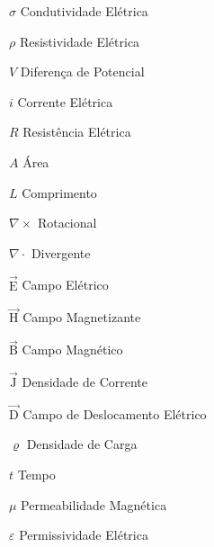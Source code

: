 \documentclass[12pt,twoside,oneright,a4paper,chapter=TITLE,english,brazil]{unipampa}
\newcommand{\vetor}[1]{\vec{\textrm{#1}}}
\begin{document}
\begin{simbolos}
    \item[$\sigma$]                  Condutividade Elétrica
    \item[$\rho$]                    Resistividade Elétrica
    \item[$V$]                       Diferença de Potencial
    \item[$i$]                       Corrente Elétrica
    \item[$R$]                       Resistência Elétrica
    \item[$A$]                       Área
    \item[$L$]                       Comprimento
    \item[$\nabla \times$]           Rotacional
    \item[$\nabla \cdot$]            Divergente
    \item[$\vetor{E}$]               Campo Elétrico
    \item[$\vetor{H}$]               Campo Magnetizante
    \item[$\vetor{B}$]               Campo Magnético
    \item[$\vetor{J}$]               Densidade de Corrente
    \item[$\vetor{D}$]               Campo de Deslocamento Elétrico
    \item[$\varrho$]                 Densidade de Carga
    \item[$t$]                       Tempo
    \item[$\mu$]                     Permeabilidade Magnética
    \item[$\varepsilon$]             Permissividade Elétrica    
\end{simbolos}


\tableofcontents       %
\end{document}
